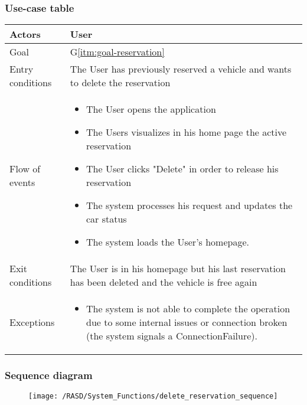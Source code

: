 \subsubsection{Use-case table}
\begin{center}
  \begin{tabular}{ l | p{10cm} }
    \hline
    Actors & User\\ \hline
    Goal & G\ref{itm:goal-reservation}\\ \hline
    Entry conditions & The User has previously reserved a vehicle and wants to delete the reservation
     \\ \hline
    Flow of events &
    \begin{itemize} 
      \item The User opens the application 
      \item The Users visualizes in his home page the active reservation
      \item The User clicks "Delete" in order to release his reservation
      \item The system processes his request and updates the car status
      \item The system loads the User's homepage.
    \end{itemize} \\ \hline
    Exit conditions & The User is in his homepage but his last reservation has been deleted and the vehicle is free again \\ \hline
  	Exceptions & 
    \begin{itemize}
      \item The system is not able to complete the operation due to some internal issues or connection broken (the system signals a ConnectionFailure). %
    \end{itemize} \\ \hline
  \end{tabular}
\end{center}


\subsubsection{Sequence diagram}
\begin{figure}[!ht]
  \centering
  \vspace{0.2cm}
  \texttt{[image: /RASD/System\_Functions/delete\_reservation\_sequence]}\\
  \vspace{0.4cm}
  \label{fig:delete_reservation_sequence} 
\end{figure}
